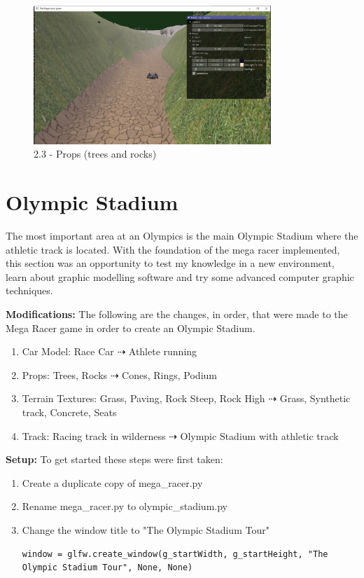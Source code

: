 \documentclass[a4 paper, 12pt]{article}
\begin{document}
    \begin{figure} [H]
        \centering
        \includegraphics[width=0.8\textwidth, frame]
            {./images/mega_racer/2.3.PNG}  
        \caption{2.3 - Props (trees and rocks)}   
    \end{figure}


\section{Olympic Stadium}
The most important area at an Olympics is the main Olympic Stadium where the athletic track is located. With the foundation of the mega racer implemented, this section was an opportunity to test my knowledge in a new environment, learn about graphic modelling software and try some advanced computer graphic techniques.

\textbf{Modifications:} The following are the changes, in order, that were made to the Mega Racer game in order to create an Olympic Stadium.
\begin{enumerate}
    \item Car Model: Race Car  $\dashrightarrow$ Athlete running    
    \item Props: Trees, Rocks $\dashrightarrow$ Cones, Rings, Podium
    \item Terrain Textures: Grass, Paving, Rock Steep, Rock High $\dashrightarrow$ Grass, Synthetic track, Concrete, Seats
    \item Track: Racing track in wilderness $\dashrightarrow$ Olympic Stadium with athletic track
\end{enumerate}

\textbf{Setup:} To get started these steps were first taken:
\begin{enumerate}
    \item Create a duplicate copy of mega\_racer.py
    \item Rename mega\_racer.py to olympic\_stadium.py
    \item Change the window title to "The Olympic Stadium Tour"

    \begin{lstlisting}
window = glfw.create_window(g_startWidth, g_startHeight, "The Olympic Stadium Tour", None, None)
\end{lstlisting}
\end{enumerate}
\end{document}
